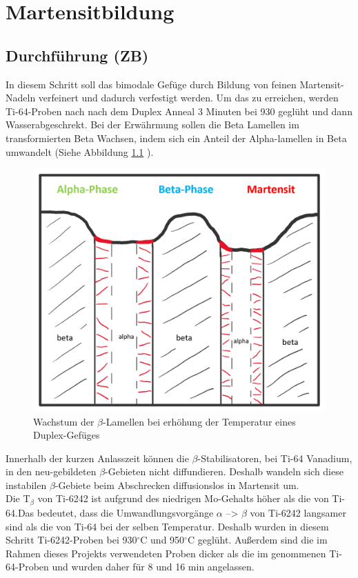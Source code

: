 \chapter{Martensitbildung}
\label{MB1}

\section{Durchführung (ZB)}

In diesem Schritt soll das bimodale Gefüge durch Bildung von feinen Martensit-Nadeln verfeinert und dadurch verfestigt werden. Um das zu erreichen, werden Ti-64-Proben nach \cite{Morita.2005} nach dem Duplex Anneal 3 Minuten bei 930 geglüht und dann Wasserabgeschrekt. Bei der Erwährmung sollen die Beta Lamellen im transformierten Beta Wachsen, indem sich ein Anteil der Alpha-lamellen in Beta umwandelt (Siehe Abbildung \ref{fig:martensit-einzeln} ).

\begin{figure}
	\centering
	\includegraphics[width=0.7\linewidth]{./Bilder/Martensit einzeln.png}
	\caption{Wachstum der $\beta$-Lamellen bei erhöhung der Temperatur eines Duplex-Gefüges}
	\label{fig:martensit-einzeln}
\end{figure}

Innerhalb der kurzen Anlasszeit können die $\beta$-Stabilisatoren, bei Ti-64 Vanadium, in den neu-gebildeten $\beta$-Gebieten nicht diffundieren. Deshalb wandeln sich diese instabilen $\beta$-Gebiete beim Abschrecken diffusionslos in Martensit um.\\

Die T$_\beta$ von Ti-6242 ist aufgrund des niedrigen Mo-Gehalts höher als die von Ti-64.Das bedeutet, dass die Umwandlungsvorgänge $\alpha$ --> $\beta$ von Ti-6242 langsamer sind als die von Ti-64 bei der selben Temperatur. Deshalb wurden in diesem Schritt Ti-6242-Proben bei 930$^\circ$C und 950$^\circ$C  geglüht. Außerdem sind die im Rahmen dieses Projekts verwendeten Proben dicker als die im \cite{Morita.2005} genommenen Ti-64-Proben und wurden daher für 8 und 16 min angelassen.


